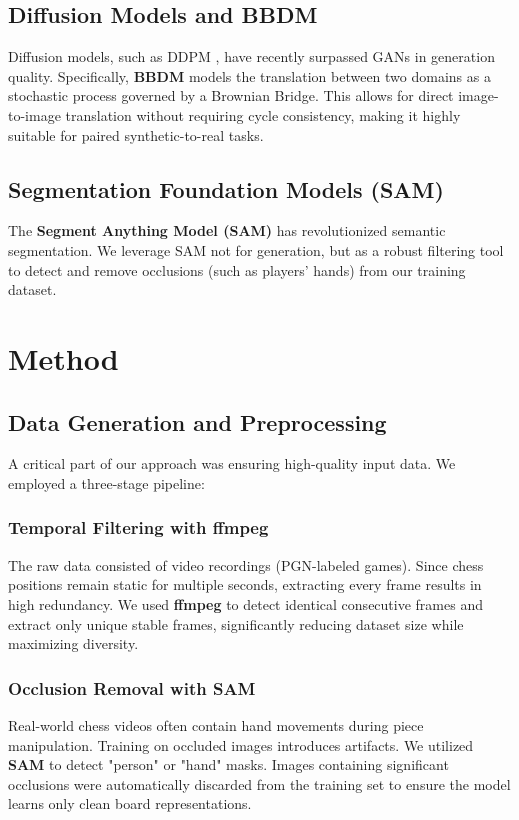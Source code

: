 \documentclass[12pt,a4paper]{article}
\begin{document}
\subsection{Diffusion Models and BBDM}
Diffusion models, such as DDPM \cite{ddpm2020}, have recently surpassed GANs in generation quality. Specifically, \textbf{BBDM} \cite{bbdm2023} models the translation between two domains as a stochastic process governed by a Brownian Bridge. This allows for direct image-to-image translation without requiring cycle consistency, making it highly suitable for paired synthetic-to-real tasks.

\subsection{Segmentation Foundation Models (SAM)}
The \textbf{Segment Anything Model (SAM)} \cite{sam2023} has revolutionized semantic segmentation. We leverage SAM not for generation, but as a robust filtering tool to detect and remove occlusions (such as players' hands) from our training dataset.

\section{Method}
\label{sec:method}

\subsection{Data Generation and Preprocessing}
\label{subsec:data_gen}
A critical part of our approach was ensuring high-quality input data. We employed a three-stage pipeline:

\subsubsection{Temporal Filtering with ffmpeg}
The raw data consisted of video recordings (PGN-labeled games). Since chess positions remain static for multiple seconds, extracting every frame results in high redundancy. We used \textbf{ffmpeg} to detect identical consecutive frames and extract only unique stable frames, significantly reducing dataset size while maximizing diversity.

\subsubsection{Occlusion Removal with SAM}
Real-world chess videos often contain hand movements during piece manipulation. Training on occluded images introduces artifacts. We utilized \textbf{SAM} \cite{sam2023} to detect "person" or "hand" masks. Images containing significant occlusions were automatically discarded from the training set to ensure the model learns only clean board representations.
\end{document}
